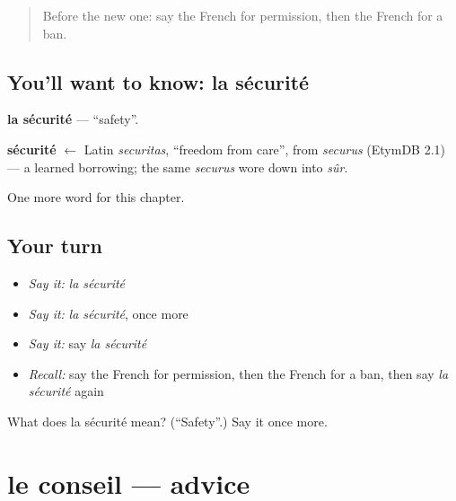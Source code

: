 \label{lesson:FR-C168-securite}



\begin{quote}
Before the new one: say the French for permission, then the French for a ban.
\end{quote}

\subsection*{You'll want to know: la sécurité}
\textbf{la sécurité} — \textquotedblleft{}safety\textquotedblright{}.

\begin{cousinweb}
\textbf{sécurité} $\leftarrow$ Latin \emph{securitas}, \textquotedblleft{}freedom from care\textquotedblright{}, from \emph{securus} (EtymDB 2.1) — a learned borrowing; the same \emph{securus} wore down into \emph{sûr}.
\end{cousinweb}

\begin{grammarlens}[title={What you've built}]
One more word for this chapter.
\end{grammarlens}

\subsection*{Your turn}
\begin{itemize}
\raggedright
  \item \emph{Say it:} \emph{la sécurité}
  \item \emph{Say it:} \emph{la sécurité}, once more
  \item \emph{Say it:} say \emph{la sécurité}
  \item \emph{Recall:} say the French for permission, then the French for a ban, then say \emph{la sécurité} again
\end{itemize}

\begin{tcolorbox}[breakable,colback=teal!4,colframe=teal!35!black,title={Before you move on}]
What does la sécurité mean? (\textquotedblleft{}Safety\textquotedblright{}.) Say it once more.
\end{tcolorbox}
\section[le conseil]{le conseil — advice}

\label{lesson:FR-C168-conseil}



